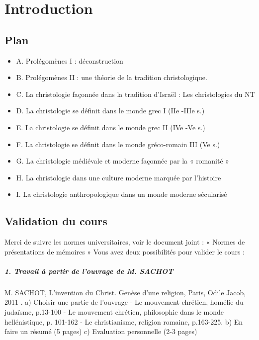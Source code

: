 \chapter{Introduction}

 
 \section{Plan}
 
 \begin{itemize}
     \item A. Prolégomènes I : déconstruction
     \item B. Prolégomènes II : une théorie de la tradition christologique.
     \item C. La christologie façonnée dans la tradition d’Israël : Les christologies du NT
     \item D. La christologie se définit dans le monde grec I (IIe
-IIIe s.)
     \item E. La christologie se définit dans le monde grec II (IVe
-Ve s.)
     \item F. La christologie se définit dans le monde gréco-romain III (Ve s.)
     \item G. La christologie médiévale et moderne façonnée par la « romanité »
     \item H. La christologie dans une culture moderne marquée par l’histoire
     \item I. La christologie anthropologique dans un monde moderne sécularisé
 \end{itemize}


\section{Validation du cours}
Merci de suivre les normes universitaires, voir le document joint : « Normes de présentations
de mémoires »
Vous avez deux possibilités pour valider le cours :
\paragraph{1. Travail à partir de l’ouvrage de M. SACHOT}
M. SACHOT, L’invention du Christ. Genèse d’une religion, Paris, Odile Jacob, 2011
.
a) Choisir une partie de l’ouvrage
- Le mouvement chrétien, homélie du judaïsme, p.13-100
- Le mouvement chrétien, philosophie dans le monde hellénistique, p. 101-162
- Le christianisme, religion romaine, p.163-225.
b) En faire un résumé (5 pages)
c) Evaluation personnelle (2-3 pages)

